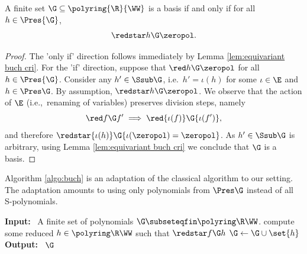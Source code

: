 \begin{lemma} \label{lem:effective buch cri}
A finite set $\G \subseteq \polyring{\R}{\WW}$ is a \Gr basis 
if and only if for all $h \in \Pres{\G}$,
\[
\redstar h \G \zeropol.
\]
\end{lemma}
%
\begin{proof}
The 'only if' direction follows immediately by Lemma \ref{lem:equivariant buch cri}.
For the 'if' direction, suppose that $\red h \G \zeropol$ for all $h \in \Pres{\G}$.
Consider any $h' \in \Ssub \G$, i.e.~$h' = \iota(h)$ for some $\iota\in\E$ 
and $h\in \Pres \G$.
By assumption, $\redstar h \G \zeropol$.
We observe that the action of $\E$ (i.e.,~renaming of variables) preserves division steps, namely
\[
\red f \G f' \implies \red {\iota(f)} \G {\iota(f')},
\]
and therefore $\redstar {\iota(h)} \G {\iota(\zeropol) = \zeropol}$.
As $h'\in\Ssub\G$ is arbitrary, 
using Lemma \ref{lem:equivariant buch cri} we conclude that
$\G$ is a \Gr basis.
\end{proof}



Algorithm \ref{algo:buch} is an adaptation of the classical \Bu algorithm to our setting.
The adaptation amounts to using only polynomials from 
$\Pres \G$ instead
of all S-polynomials.


%


\begin{algorithm}[H]
\caption{\textsc{Equivariant \Bu algorithm}}%
\label{algo:buch}
\begin{algorithmic}[0]
\State \textbf{Input:} \ A finite set of polynomials $\G\subseteqfin \polyring \R \WW$.
\medskip
\Repeat
\smallskip
{}
\State compute some reduced $h\in\polyring\R\WW$ such that $\redstar f \G h$ 
 $\G \gets \G\cup \set{h}$ %
\EndIf 
\EndFor
{}
\medskip
\State \textbf{Output:} \ $\G$
\end{algorithmic}
\end{algorithm}                                                                                                                                                                  


